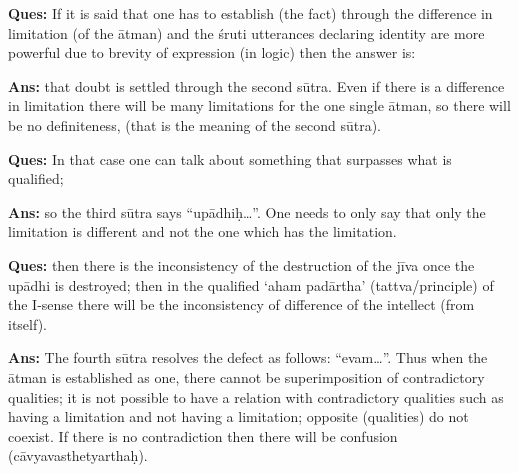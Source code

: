 \textbf{Ques:} If it is said that one has to establish (the fact) through the difference in limitation (of the ātman) and the śruti utterances declaring identity are more powerful due to brevity of expression (in logic) then the answer is: 

\textbf{Ans:} that doubt is settled through the second sūtra. Even if there is a difference in limitation there will be many limitations for the one single ātman, so there will be no definiteness, (that is the meaning of the second sūtra).

\textbf{Ques:} In that case one can talk about something that surpasses what is qualified; 

\textbf{Ans:} so the third sūtra says “upādhiḥ…”. One needs to only say that only the limitation is different and not the one which has the limitation. 

\textbf{Ques:} then there is the inconsistency of the destruction of the jīva once the upādhi is destroyed; then in the qualified ‘aham padārtha’ (tattva/principle) of the I-sense there will be the inconsistency of difference of the intellect (from itself).

\textbf{Ans:} The fourth sūtra resolves the defect as follows: “evam…”. Thus when the ātman is established as one, there cannot be superimposition of contradictory qualities; it is not possible to have a relation with contradictory qualities such as having a limitation and not having a limitation; opposite (qualities) do not coexist. If there is no contradiction then there will be confusion (cāvyavasthetyarthaḥ).


